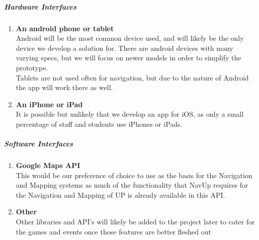 \documentclass[english]{article}
\begin{document}
    					\subparagraph{Hardware Interfaces}
    						\begin{enumerate}
    						    \item \textbf{An android phone or tablet} \\
    						    Android will be the most common device used, and will likely be the only device we develop a solution for. There are android devices with many varying specs, but we will focus on newer models in order to simplify the prototype. \\
    						    Tablets are not used often for navigation, but due to the nature of Android the app will work there as well.    						    
    						    \item \textbf{An iPhone or iPad} \\
    						    It is possible but unlikely that we develop an app for iOS, as only a small percentage of staff and students use iPhones or iPads.
    						\end{enumerate}
    						
    					\subparagraph{Software Interfaces}
        					\begin{enumerate}
        					    \item \textbf{Google Maps API}\\
        					    This would be our preference of choice to use as the basis for the Navigation and Mapping systems as much of the functionality that NavUp requires for the Navigation and Mapping of UP is already available in this API.
        					    \item \textbf{Other}\\
        					    Other libraries and API's will likely be added to the project later to cater for the games and events once those features are better fleshed out
        					    
        					    
        					\end{enumerate}
\end{document}
